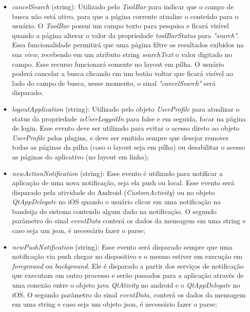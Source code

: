 \begin{itemize}
\begin{itemize}
		\item \textit{cancelSearch} (string): Utilizado pelo \textit{ToolBar} para indicar que o campo de busca não está ativo, para que a página corrente atualize o conteúdo para o usuário. O \textit{ToolBar} possui um campo texto para pesquisa e ficará visível quando a página alterar o valor da propriedade \textit{toolBarStatus} para \textit{"search"}. Essa funcionalidade permitirá que uma página filtre os resultados exibidos na sua \textit{view}, recebendo em um atributo string \textit{searchText} o valor digitado no campo. Esse recurso funcionará somente no layout em pilha. O usuário poderá cancelar a busca clicando em um botão voltar que ficará visível ao lado do campo de busca, nesse momento, o sinal \textit{"cancelSearch"} será disparado;

		\item \textit{logoutApplication} (string): Utilizado pelo objeto \textit{UserProfile} para atualizar o status da propriedade \textit{isUserLoggedIn} para false e em seguida, focar na página de login. Esse evento deve ser utilizado para evitar o acesso direto ao objeto \textit{UserProfile} pelos plugins, e deve ser emitido sempre que desejar remover todas as páginas da pilha (caso o layout seja em pilha) ou desabilitar o acesso as páginas do aplicativo (no layout em linha);

		\item \textit{newActionNotification} (string): Esse evento é utilizado para notificar a aplicação de uma nova notificação, seja ela push ou local. Esse evento será disparado pela atividade do Android (\textit{CustomActivity}) ou no objeto \textit{QtAppDelegate} no iOS quando o usuário clicar em uma notificação na bandeija do sistema contendo algum dado na notificação. O segundo parâmetro do sinal \textit{eventData} conterá os dados da mensagem em uma string e caso seja um json, é necessário fazer o parse;

		\item \textit{newPushNotification} (string): Esse evento será disparado sempre que uma notificação via push chegar no dispositivo e o mesmo estiver em execução em \textit{foreground} ou \textit{background}. Ele é disparado a partir dos serviços de notificação que executam em outro processo e serão passados para a aplicação através de uma conexão entre o objeto java \textit{QtAtivity} no android e o \textit{QtAppDelegate} no iOS. O segundo parâmetro do sinal \textit{eventData}, conterá os dados da mensagem em uma string e caso seja um objeto json, é necessário fazer o parse;


\end{itemize}
\end{itemize}
